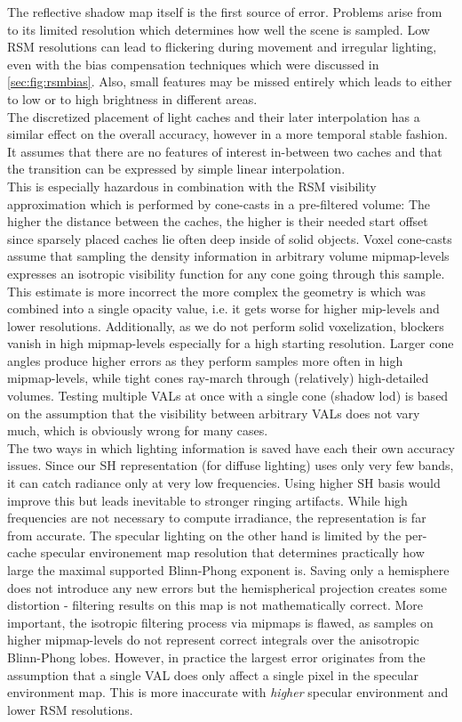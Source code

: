\documentclass[thesis.tex]{subfiles}
\begin{document}
The reflective shadow map itself is the first source of error.
Problems arise from to its limited resolution which determines how well the scene is sampled.
Low RSM resolutions can lead to flickering during movement and irregular lighting, even with the bias compensation techniques which were discussed in \autoref{sec:fig:rsmbias}.
Also, small features may be missed entirely which leads to either to low or to high brightness in different areas.
\\
The discretized placement of light caches and their later interpolation has a similar effect on the overall accuracy, however in a more temporal stable fashion.
It assumes that there are no features of interest in-between two caches and that the transition can be expressed by simple linear interpolation.
\\
This is especially hazardous in combination with the RSM visibility approximation which is performed by cone-casts in a pre-filtered volume:
The higher the distance between the caches, the higher is their needed start offset since sparsely placed caches lie often deep inside of solid objects.
Voxel cone-casts assume that sampling the density information in arbitrary volume mipmap-levels expresses an isotropic visibility function for any cone going through this sample.
This estimate is more incorrect the more complex the geometry is which was combined into a single opacity value, i.e. it gets worse for higher mip-levels and lower resolutions.
Additionally, as we do not perform solid voxelization, blockers vanish in high mipmap-levels especially for a high starting resolution.
Larger cone angles produce higher errors as they perform samples more often in high mipmap-levels, while tight cones ray-march through (relatively) high-detailed volumes.
Testing multiple VALs at once with a single cone (shadow lod) is based on the assumption that the visibility between arbitrary VALs does not vary much, which is obviously wrong for many cases.
\\
The two ways in which lighting information is saved have each their own accuracy issues.
Since our SH representation (for diffuse lighting) uses only very few bands, it can catch radiance only at very low frequencies.
Using higher SH basis would improve this but leads inevitable to stronger ringing artifacts.
While high frequencies are not necessary to compute irradiance, the representation is far from accurate. 
The specular lighting on the other hand is limited by the per-cache specular environement map resolution that determines practically how large the maximal supported Blinn-Phong exponent is.
Saving only a hemisphere does not introduce any new errors but the hemispherical projection creates some distortion - filtering results on this map is not mathematically correct.
More important, the isotropic filtering process via mipmaps is flawed, as samples on higher mipmap-levels do not represent correct integrals over the anisotropic Blinn-Phong lobes.
However, in practice the largest error originates from the assumption that a single VAL does only affect a single pixel in the specular environment map.
This is more inaccurate with \emph{higher} specular environment and lower RSM resolutions.
\end{document}
